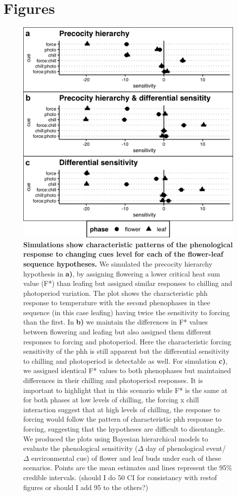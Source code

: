 \documentclass[11pt]{article}
\begin{document}
\section*{Figures}
\begin{figure}[h!]
    \centering
         \includegraphics[width=.8\textwidth]{..//Plots/Flobuds_manuscript_figs/simulations.png}
    \caption{\textbf{Simulations show characteristic patterns of the phenological response to changing cues level for each of the flower-leaf sequence hypotheses.} We simulated the precocity hierarchy hypothesis in \textbf{a)}, by assigning flowering a lower critical heat sum value (F*) than leafing but assigned similar responses to chilling and photoperiod variation. The plot shows the characteristic phh response to temperature with the second phenophases in thee sequence (in this case leafing) having twice the sensitivity to forcing than the first. In \textbf{b)} we maintain the differences in F* values between flowering and leafing but also assigned them different responses to forcing and photoperiod. Here the characteristic forcing sensitivity of the phh is still apparent but the differential sensitivity to chilling and photoperiod is detectable as well. For simulation \textbf{c)}, we assigned identical F* values to both phenophases but maintained differences in their chilling and photoperiod responses. It is important to highlight that in this scenario while F* is the same at for both phases at low levels of chilling, the forcing x chill interaction suggest that at high levels of chilling, the response to forcing would follow the pattern of characteristic phh response to forcing, suggesting that the hypotheses are difficult to disentangle. We produced the plots using Bayesian hierarchical models to evaluate the phenological sensitivity ($\Delta$ day of phenological event/ $\Delta$ environmental cue) of flower and leaf buds under each of these scenarios. Points are the mean estimates and lines represent the 95\% credible intervals. (should I do 50 CI for consistancy with restof figures or should I add 95 to the others?) } 
    \label{fig:simulations}
\end{figure}
\end{document}
